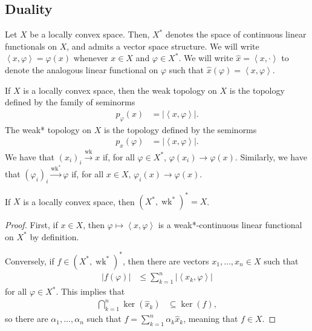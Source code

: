 \documentclass[10pt]{mypackage}
\begin{document}
\subsection{Duality}%
Let $X$ be a locally convex space. Then, $X^{\ast}$ denotes the space of continuous linear functionals on $X$, and admits a vector space structure. We will write $\left\langle x,\varphi \right\rangle = \varphi(x)$ whenever $x\in X$ and $\varphi\in X^{\ast}$. We will write $ \hat{x} = \left\langle x,\cdot \right\rangle $ to denote the analogous linear functional on $\varphi$ such that $\hat{x}(\varphi) = \left\langle x,\varphi \right\rangle$.
\begin{definition}
  If $X$ is a locally convex space, then the weak topology on $X$ is the topology defined by the family of seminorms
  \begin{align*}
    p_{\varphi}(x) &= \left\vert \left\langle x,\varphi \right\rangle \right\vert.
  \end{align*}
  The weak* topology on $X$ is the topology defined by the seminorms
  \begin{align*}
    p_{x}\left( \varphi \right) &= \left\vert \left\langle x,\varphi \right\rangle \right\vert.
  \end{align*}
  We have that $\left( x_i \right)_{i}\xrightarrow{\operatorname{wk}} x$ if, for all $\varphi\in X^{\ast}$, $\varphi\left( x_i \right)\rightarrow \varphi(x)$. Similarly, we have that $\left( \varphi_i \right)_i\xrightarrow{\operatorname{wk}^{\ast}} \varphi$ if, for all $x\in X$, $\varphi_i(x)\rightarrow \varphi(x)$.
\end{definition}
\begin{theorem}
  If $X$ is a locally convex space, then $\left( X^{\ast},\operatorname{wk}^{\ast} \right)^{\ast} = X$.
\end{theorem}
\begin{proof}
  First, if $x\in X$, then $ \varphi\mapsto \left\langle x,\varphi \right\rangle $ is a weak*-continuous linear functional on $X^{\ast}$ by definition.

  Conversely, if $f\in \left( X^{\ast},\operatorname{wk}^{\ast} \right)^{\ast}$, then there are vectors $x_1,\dots,x_n\in X$ such that
  \begin{align*}
    \left\vert f\left( \varphi \right) \right\vert &\leq \sum_{k=1}^{n} \left\vert \left\langle x_k,\varphi \right\rangle \right\vert
  \end{align*}
  for all $\varphi\in X^{\ast}$. This implies that
  \begin{align*}
    \bigcap_{k=1}^{n} \ker\left( \hat{x}_{k} \right) &\subseteq \ker\left( f \right),
  \end{align*}
  so there are $\alpha_1,\dots,\alpha_n$ such that $f = \sum_{k=1}^{n}\alpha_k\hat{x}_k$, meaning that $f\in X$. 
\end{proof}
\end{document}

